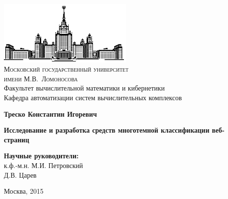 \documentclass[russian, utf8, emptystyle]{eskdtext}
\begin{document}
\thispagestyle{empty}

\begin{center}
	\ \vspace{-2cm}
	
	\includegraphics[width=0.5\textwidth]{msu.eps}\\
	{\scshape Московский государственный университет \\ имени М.В.~Ломоносова}\\
	Факультет вычислительной математики и кибернетики\\
	Кафедра  автоматизации систем вычислительных комплексов
	
	\vspace{4cm}
	
	\textbf{{\Large Треско Константин Игоревич}}
	
	\vspace{1cm}
	
	{\Huge\bfseries
	Исследование и разработка средств многотемной классификации веб-страниц\\}
\end{center}

\vspace{1cm}


\vspace{2cm}

\vfill

\begin{flushright}
	\normalsize
	\textbf{Научные руководители:}\\
	к.ф.-м.н. М.И. Петровский\\
	Д.В. Царев
\end{flushright}

\vfill

\begin{center}
	Москва, 2015
\end{center}

\enlargethispage{4\baselineskip}
\end{document}
